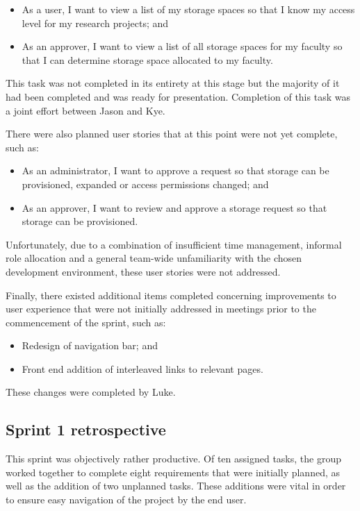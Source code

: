 \documentclass[a4paper,titlepage,12pt]{article}
\begin{document}
\begin{itemize}
	\item As a user, I want to view a list of my storage spaces so that I
	      know my access level for my research projects; and
	\item As an approver, I want to view a list of all storage spaces for
	      my faculty so that I can determine storage space allocated to my
	      faculty.
\end{itemize}

This task was not completed in its entirety at this stage but the majority of
it had been completed and was ready for presentation. Completion of this task
was a joint effort between Jason and Kye.

There were also planned user stories that at this point were not yet complete,
such as:

\begin{itemize}
	\item As an administrator, I want to approve a request so that storage
	      can be provisioned, expanded or access permissions changed; and
	\item As an approver, I want to review and approve a storage request so
	      that storage can be provisioned.
\end{itemize}

Unfortunately, due to a combination of insufficient time management, informal
role allocation and a general team-wide unfamiliarity with the chosen
development environment, these user stories were not addressed.

Finally, there existed additional items completed concerning improvements to
user experience that were not initially addressed in meetings prior to the
commencement of the sprint, such as:

\begin{itemize}
	\item Redesign of navigation bar; and
	\item Front end addition of interleaved links to relevant pages.
\end{itemize}

These changes were completed by Luke.

\subsection{Sprint 1 retrospective}

This sprint was objectively rather productive. Of ten assigned tasks, the group
worked together to complete eight requirements that were initially planned, as
well as the addition of two unplanned tasks. These additions were vital in
order to ensure easy navigation of the project by the end user.
\end{document}
